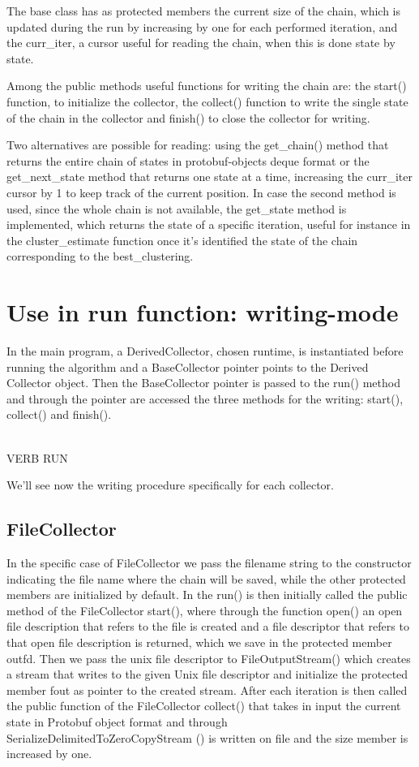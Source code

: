 The base class has as protected members the current size of the chain, which is updated during the run by increasing by one for each performed  iteration, and the curr\_iter, a cursor useful for reading the chain, when this is done state by state.

Among the public methods useful functions for writing the chain are: the start() function, to initialize the collector, the collect() function to write the single state of the chain in the collector and finish() to close the collector for writing. 

Two alternatives are possible for reading: using the get\_chain() method that returns the entire chain of states in protobuf-objects deque format or the get\_next\_state method that returns one state at a time, increasing the curr\_iter cursor by 1 to keep track of the current position. In case the second method is used, since the whole chain is not available, the get\_state method is implemented, which returns the state of a specific iteration, useful for instance in the cluster\_estimate function once it’s  identified the state of the chain corresponding to the best\_clustering.

\section{Use in run function: writing-mode}
In the main program, a DerivedCollector, chosen runtime, is instantiated before running the algorithm and a BaseCollector pointer points to the Derived Collector object.
Then the BaseCollector pointer is passed to the run() method and through the pointer are accessed the three methods for the writing: start(), collect() and finish().

\\VERB RUN

We'll see now the writing procedure specifically for each collector.

\subsection{FileCollector}

In the specific case of FileCollector we pass the filename string to the constructor  indicating the file name where the chain will be saved, while the other protected members are initialized by default. In the run() is then initially called the public method of the FileCollector start(), where through the function open() an open file description that refers to the file is created and a file descriptor that refers to that open file description is returned, which we save in the protected member outfd. Then we pass the unix file descriptor to FileOutputStream() which creates a stream that writes to the given Unix file descriptor and initialize the protected member fout as pointer to the created stream.
After each iteration is then called the public function of the FileCollector collect() that takes in input the current state in Protobuf object format and through SerializeDelimitedToZeroCopyStream () is written on file and the size member is increased by one.

